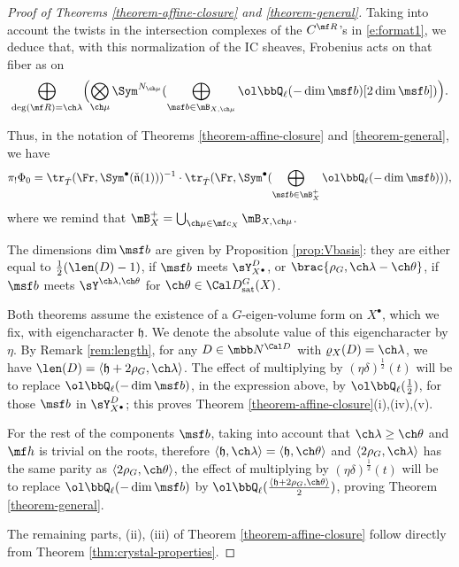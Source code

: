 \documentclass[final]{amsart}
\theoremstyle{remark}
\theoremstyle{definition}
\numberwithin{equation}{section}
\begin{document}
\begin{proof}[Proof of Theorems \ref{theorem-affine-closure} and \ref{theorem-general}]
Taking into account the twists in the intersection complexes of the $C^{\mf R}$'s in \eqref{e:format1}, we deduce that, with this normalization of the IC sheaves, Frobenius acts on that fiber as on
\[
\bigoplus_{\deg(\mf R)=\ch\lambda} 
\Bigl( \bigotimes_{\ch\mu} 
\Sym^{N_{\ch\mu}}(\bigoplus_{\msf b\in \mB_{X,\ch\mu}} \ol\bbQ_\ell(-\dim \msf b)[2\dim \msf b] )\Bigr).
\]

Thus, in the notation of Theorems \ref{theorem-affine-closure} and \ref{theorem-general}, we have
\[\pi_! \Phi_0 = \tr_{\check T}(\Fr, \Sym^\bullet (\check{\mathfrak n}(1)))^{-1} \cdot \tr_{\check T}(\Fr, \Sym^\bullet (\bigoplus_{\msf b\in \mB_X^+} \ol\bbQ_\ell(-\dim \msf b))),\]
where we remind that $\mB_X^+ = \bigcup_{\ch\mu\in \mf c_X} \mB_{X,\ch\mu}$. 

The dimensions $\dim \msf b$ are given by Proposition \ref{prop:Vbasis}:
they are either equal to $\frac 1 2(\len(D)-1)$, if $\msf b$ meets $\sY_{X^\bullet}^{D}$, or $\brac{\rho_G,\ch\lambda-\ch\theta}$, if $\msf b$ meets $\sY^{\ch\lambda,\ch\theta}$ for $\ch\theta \in \Cal D^G_{\mathrm{sat}}(X)$. 

Both theorems assume the existence of a $G$-eigen-volume form on $X^\bullet$, which we fix, with eigencharacter $\mathfrak h$. We denote the absolute value of this eigencharacter by $\eta$. By Remark \ref{rem:length}, for any $D\in \mbb N^{\Cal D}$ with $\varrho_X(D)=\ch\lambda$, we have $ \len (D) = \left< \mathfrak h + 2\rho_G, \ch\lambda\right>$. The effect of multiplying by $  (\eta\delta)^\frac{1}{2}(t)$ will be to replace $\ol\bbQ_\ell(-\dim \msf b)$, in the expression above, by $\ol\bbQ_\ell(\frac{1}{2})$, for those $\msf b$ in $\sY_{X^\bullet}^{D}$; this proves Theorem \ref{theorem-affine-closure}(i),(iv),(v).  

For the rest of the components $\msf b$, taking into account that $\ch\lambda\ge \ch\theta$ and $\mf h$ is trivial on the roots, therefore $\left<\mathfrak h ,\ch\lambda \right> = \left<\mathfrak h, \ch\theta\right>$ and $\left< 2\rho_G, \ch\lambda\right>$ has the same parity as $\left<  2\rho_G, \ch\theta\right>$, the effect of multiplying by $  (\eta\delta)^\frac{1}{2}(t)$ will be to replace $\ol\bbQ_\ell(-\dim \msf b)$ by $\ol\bbQ_\ell(\frac{\left<\mathfrak h + 2\rho_G,\ch\theta\right>}{2})$, proving Theorem \ref{theorem-general}. 

The remaining parts, (ii), (iii) of Theorem \ref{theorem-affine-closure} follow directly from Theorem \ref{thm:crystal-properties}.
\end{proof}
\end{document}
